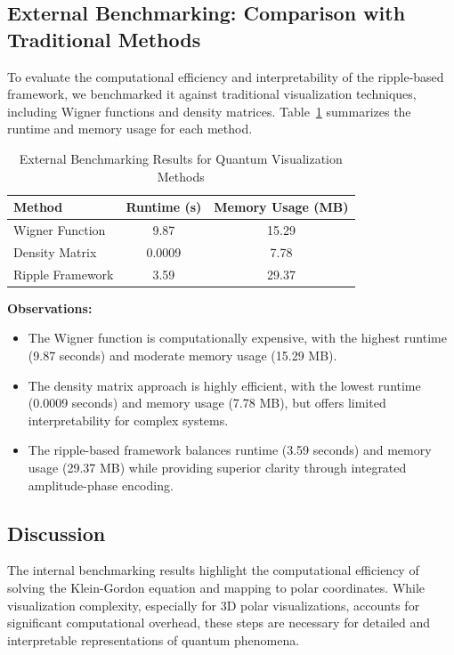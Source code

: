 \documentclass[12pt]{article}
\begin{document}
\subsection{External Benchmarking: Comparison with Traditional Methods}

To evaluate the computational efficiency and interpretability of the ripple-based framework, we benchmarked it against traditional visualization techniques, including Wigner functions and density matrices. Table~\ref{tab:benchmark_methods} summarizes the runtime and memory usage for each method.

\begin{table}[H]
\centering
\caption{External Benchmarking Results for Quantum Visualization Methods}
\begin{tabular}{|l|c|c|}
    \hline
    \textbf{Method} & \textbf{Runtime (s)} & \textbf{Memory Usage (MB)} \\
    \hline
    Wigner Function & 9.87 & 15.29 \\
    Density Matrix & 0.0009 & 7.78 \\
    Ripple Framework & 3.59 & 29.37 \\
    \hline
\end{tabular}
\label{tab:benchmark_methods}
\end{table}

\textbf{Observations:}
\begin{itemize}
    \item The Wigner function is computationally expensive, with the highest runtime (9.87 seconds) and moderate memory usage (15.29 MB).
    \item The density matrix approach is highly efficient, with the lowest runtime (0.0009 seconds) and memory usage (7.78 MB), but offers limited interpretability for complex systems.
    \item The ripple-based framework balances runtime (3.59 seconds) and memory usage (29.37 MB) while providing superior clarity through integrated amplitude-phase encoding.
\end{itemize}

\subsection{Discussion}

The internal benchmarking results highlight the computational efficiency of solving the Klein-Gordon equation and mapping to polar coordinates. While visualization complexity, especially for 3D polar visualizations, accounts for significant computational overhead, these steps are necessary for detailed and interpretable representations of quantum phenomena.
\end{document}
